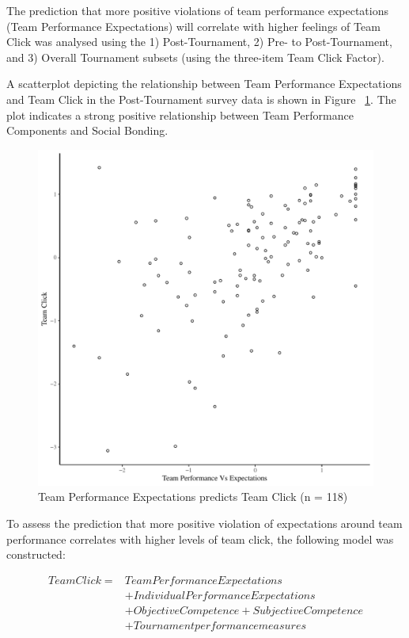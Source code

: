 \begin{CJK}{UTF8}{gbsn}
The prediction that more positive violations of team performance expectations (Team Performance Expectations) will correlate with higher feelings of Team Click was analysed using the 1) Post-Tournament, 2) Pre- to Post-Tournament, and 3) Overall Tournament subsets (using the three-item Team Click Factor).

A scatterplot depicting the relationship between Team Performance Expectations and Team Click in the Post-Tournament survey data is shown in Figure ~\ref{fig:teamPerfClickBasicXY}. The plot indicates a strong positive relationship between Team Performance Components and Social Bonding.

\begin{figure}[htbp]
  \centering
\includegraphics[scale=.5]{images/teamPerfClickBasicXY.pdf}
  \caption{Team Performance Expectations predicts Team Click (n = 118)}
  \label{fig:teamPerfClickBasicXY}
\end{figure}

To assess the prediction that more positive violation of expectations around team performance correlates with higher levels of team click, the following model was constructed:


    \begin{align*}
      Team Click =  & Team Performance Expectations \\
                &+ Individual Performance Expectations \\
                &+ Objective Competence + Subjective Competence \\
                &+ Tournament performance measures \\
    \end{align*}



\end{CJK}

